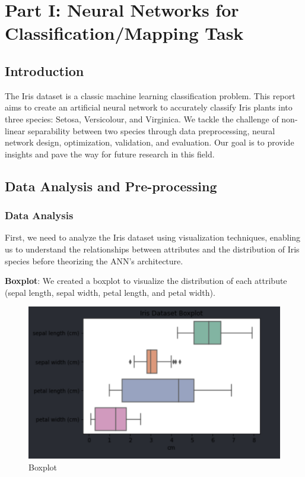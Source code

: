 \documentclass[conference]{inc/IEEEtran}
\begin{document}
\section{Part I: Neural Networks for Classification/Mapping Task}

\subsection{Introduction}

The Iris dataset is a classic machine learning classification problem. This report aims to create an artificial neural
network to accurately classify Iris plants into three species: Setosa, Versicolour, and Virginica. We tackle the
challenge of non-linear separability between two species through data preprocessing, neural network design, optimization, 
validation, and evaluation. Our goal is to provide insights and pave the way for future research in this field.

\subsection{Data Analysis and Pre-processing}

\subsubsection{Data Analysis}
First, we need to analyze the Iris dataset using visualization techniques, enabling us to understand the relationships between attributes and the distribution of Iris species before theorizing the ANN's architecture.

\textbf{Boxplot}: We created a boxplot to visualize the distribution of each attribute (sepal length, sepal width,
  petal length, and petal width).

  \begin{figure}
    \includegraphics[width=\linewidth]{figures/boxplot.png}
    \caption{Boxplot}
    \label{fig:boat1}
  \end{figure}
\end{document}
